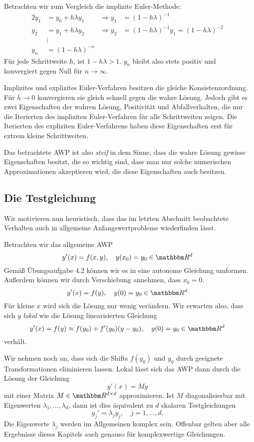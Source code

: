 \documentclass[12pt,a4paper]{book}
\theoremstyle{break}
\theoremstyle{nonumberplain}
\newcommand{\R}{\mathbbm R}
\newcommand{\1}{\mathbbm{1}} 			      	%
\begin{document}
Betrachten wir zum Vergleich die implizite Euler-Methode:
\begin{alignat*}{2}
y_1 &= y_0 + h \lambda y_1 &\Longrightarrow y_1&= (1-h\lambda)^{-1}\\
y_2 &= y_1 + h \lambda y_2 &\Longrightarrow y_2&= (1-h\lambda)^{-1} y_1= (1-h\lambda)^{-2}\\ 
& \vdots\\
y_n&=  (1-h\lambda)^{-n}
\end{alignat*}
Für jede Schrittweite $h$, ist $1-h\lambda>1$. $y_n$ bleibt also stets positiv und konvergiert gegen Null für $n\to \infty$.

Implizites und explizites Euler-Verfahren besitzen die gleiche Konsistenzordnung. Für $h\to 0$ konvergieren sie gleich schnell gegen die wahre Lösung. Jedoch gibt es zwei Eigenschaften der wahren Lösung, Positivität und Abfallverhalten, 
die nur die Iterierten des impliziten Euler-Verfahren für alle Schrittweiten zeigen. Die Iterierten des expliziten Euler-Verfahrens haben diese Eigenschaften erst für extrem kleine Schrittweiten.

Das betrachtete AWP ist also \emph{steif} in dem Sinne, dass die wahre Lösung gewisse Eigenschaften besitzt, die 
so wichtig sind, dass man nur solche numerischen Approximationen akzeptieren wird, die diese Eigenschaften auch besitzen.

\subsection{Die Testgleichung}

Wir motivieren nun heuristisch, dass das im letzten Abschnitt beobachtete Verhalten
auch in allgemeine Anfangswertprobleme wiederfinden lässt.


Betrachten wir das allgemeine AWP
\[
y'(x)=f(x,y), \quad y(x_0)=y_0\in \R^d
\]
Gemäß Übungsaufgabe 4.2 können wir es in eine autonome Gleichung umformen. Außerdem können wir durch Verschiebung annehmen, 
dass $x_0=0$.
\[
y'(x)=f(y),  \quad y(0)=y_0\in \R^d
\]
Für kleine $x$ wird sich die Lösung nur wenig verändern. Wir erwarten also, dass sich 
$y$ \emph{lokal} wie die Lösung linearisierten Gleichung
\[
y'(x)=f(y)\approx f(y_0)+f'(y_0)(y-y_0), \quad y(0)=y_0\in \R^d
\]
verhält. 

Wir nehmen noch an, dass sich die Shifts $f(y_0)$ und $y_0$ durch geeignete Transformationen eliminieren lassen. 
Lokal lässt sich das AWP dann durch die Lösung der Gleichung 
\[
y'(x)=M y
\]
mit einer Matrix $M\in \R^{d\times d}$ approximieren. Ist $M$ diagonalisierbar mit Eigenwerten $\lambda_1,\ldots,\lambda_d$, dann ist dies äquivalent zu $d$ skalaren Testgleichungen
\[
y_j'=\lambda_j y_j, \quad j=1,\ldots,d.
\] 
Die Eigenwerte $\lambda_j$ werden im Allgemeinen komplex sein. Offenbar gelten aber alle Ergebnisse dieses Kapitels auch genauso für komplexwertige Gleichungen.
\end{document}
